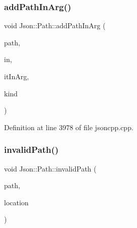 \hypertarget{class_json_1_1_path_ae65717a5fbc35b1336cbf783b15aad2e}{}\label{class_json_1_1_path_ae65717a5fbc35b1336cbf783b15aad2e} 
\subsubsection{\texorpdfstring{add\+Path\+In\+Arg()}{addPathInArg()}\hspace{0.1cm}{\footnotesize\ttfamily [2/2]}}
{\footnotesize\ttfamily void Json\+::\+Path\+::add\+Path\+In\+Arg (\begin{DoxyParamCaption}\item[{const \hyperlink{config_8h_a1e723f95759de062585bc4a8fd3fa4be}{J\+S\+O\+N\+C\+P\+P\+\_\+\+S\+T\+R\+I\+NG} \&}]{path,  }\item[{const \hyperlink{class_json_1_1_path_ab29d7b2fc896c7d3c5ed4609af3a3f23}{In\+Args} \&}]{in,  }\item[{In\+Args\+::const\+\_\+iterator \&}]{it\+In\+Arg,  }\item[{\hyperlink{class_json_1_1_path_argument_a2420bbad778573c147e578701b84d9b9}{Path\+Argument\+::\+Kind}}]{kind }\end{DoxyParamCaption})\hspace{0.3cm}{\ttfamily [private]}}



Definition at line 3978 of file jsoncpp.\+cpp.

\hypertarget{class_json_1_1_path_a0fa77fc0cefefcfcf2f1242c79009dd9}{}\label{class_json_1_1_path_a0fa77fc0cefefcfcf2f1242c79009dd9} 
\subsubsection{\texorpdfstring{invalid\+Path()}{invalidPath()}\hspace{0.1cm}{\footnotesize\ttfamily [1/2]}}
{\footnotesize\ttfamily void Json\+::\+Path\+::invalid\+Path (\begin{DoxyParamCaption}\item[{const \hyperlink{config_8h_a1e723f95759de062585bc4a8fd3fa4be}{J\+S\+O\+N\+C\+P\+P\+\_\+\+S\+T\+R\+I\+NG} \&}]{path,  }\item[{int}]{location }\end{DoxyParamCaption})\hspace{0.3cm}{\ttfamily [private]}}

